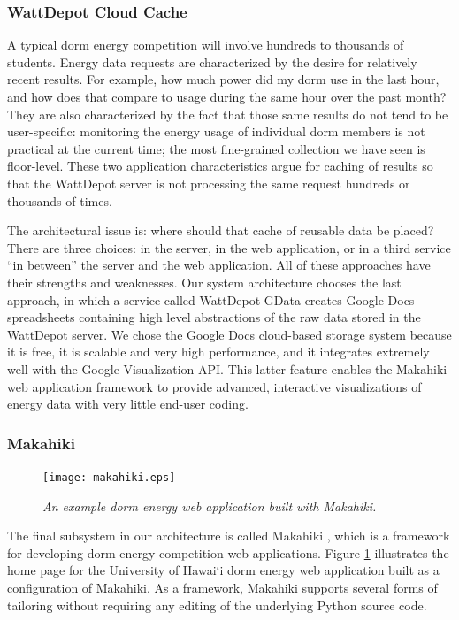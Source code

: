 \subsubsection{WattDepot Cloud Cache}

A typical dorm energy competition will involve hundreds to thousands of
students.  Energy data requests are characterized by the desire for
relatively recent results. For example, how much power did my dorm use in
the last hour, and how does that compare to usage during the same hour over
the past month? They are also characterized by the fact that those same
results do not tend to be user-specific: monitoring the energy usage of
individual dorm members is not practical at the current time; the most
fine-grained collection we have seen is floor-level. These two application
characteristics argue for caching of results so that the WattDepot server
is not processing the same request hundreds or thousands of times.

The architectural issue is: where should that cache of reusable data be
placed?  There are three choices: in the server, in the web application, or
in a third service ``in between'' the server and the web application.
All of these approaches have their strengths and weaknesses.  Our system
architecture chooses the last approach, in which a service called
WattDepot-GData creates Google Docs spreadsheets containing high level
abstractions of the raw data stored in the WattDepot server.  We chose the
Google Docs cloud-based storage system because it is free, it is scalable
and very high performance, and it integrates extremely well with the Google
Visualization API.  This latter feature enables the Makahiki web
application framework to provide advanced, interactive visualizations of
energy data with very little end-user coding.

\subsubsection{Makahiki}

\begin{figure}[htbp]
  \center
  \texttt{[image: makahiki.eps]}
  \caption{\em \small An example dorm energy web application built with Makahiki.}
  \label{fig:makahiki}
\end{figure} 

The final subsystem in our architecture is called Makahiki \cite{makahiki-site}, which is a
framework for developing dorm energy competition web applications.  Figure
\ref{fig:makahiki} illustrates the home page for the University of Hawai`i
dorm energy web application built as a configuration of Makahiki. As a
framework, Makahiki supports several forms of tailoring without requiring
any editing of the underlying Python source code.

